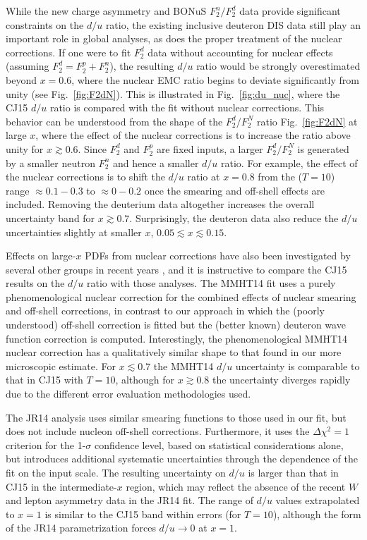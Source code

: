 \documentclass[aps,prd,amsmath,preprint]{revtex4}
\begin{document}
While the new charge asymmetry and BONuS $F_2^n/F_2^d$ data
provide significant constraints on the $d/u$ ratio, the existing
inclusive deuteron DIS data still play an important role in global
analyses, as does the proper treatment of the nuclear corrections.
If one were to fit $F_2^d$ data without accounting for nuclear
effects (assuming $F_2^d = F_2^p + F_2^n$), the resulting $d/u$
ratio would be strongly overestimated beyond $x = 0.6$, where the
nuclear EMC ratio begins to deviate significantly from unity
(see Fig.~\ref{fig:F2dN}).  This is illustrated in
Fig.~\ref{fig:du_nuc}, where the CJ15 $d/u$ ratio is compared
with the fit without nuclear corrections.
This behavior can be understood from the shape of the $F_2^d/F_2^N$
ratio Fig.~\ref{fig:F2dN} at large $x$, where the effect of the
nuclear corrections is to increase the ratio above unity for
$x \gtrsim 0.6$.  Since $F_2^d$ and $F_2^p$ are fixed inputs,
a larger $F_2^d/F_2^N$ is generated by a smaller neutron $F_2^n$
and hence a smaller $d/u$ ratio.  For example, the effect of the
nuclear corrections is to shift the $d/u$ ratio at $x = 0.8$
from the ($T=10$) range $\approx 0.1 - 0.3$ to $\approx 0 - 0.2$
once the smearing and off-shell effects are included.
%
Removing the deuterium data altogether increases the overall
uncertainty band for $x \gtrsim 0.7$.  Surprisingly, the deuteron
data also reduce the $d/u$ uncertainties slightly at smaller $x$,
$0.05 \lesssim x \lesssim 0.15$.


Effects on large-$x$ PDFs from nuclear corrections have also been
investigated by several other groups in recent years \cite{ABKM09, 
ABM11, MMSTWW13, MMHT14, NNPDF13, JR14}, and it is instructive to
compare the CJ15 results on the $d/u$ ratio with those analyses.
The MMHT14 fit \cite{MMHT14} uses a purely phenomenological nuclear
correction for the combined effects of nuclear smearing and
off-shell corrections, in contrast to our approach in which the
(poorly understood) off-shell correction is fitted but the
(better known) deuteron wave function correction is computed.
Interestingly, the phenomenological MMHT14 nuclear correction
has a qualitatively similar shape to that found in our more
microscopic estimate.  For $x \lesssim 0.7$ the MMHT14 $d/u$
uncertainty is comparable to that in CJ15 with $T=10$, although
for $x \gtrsim 0.8$ the uncertainty diverges rapidly due to the
different error evaluation methodologies used.


The JR14 analysis \cite{JR14} uses similar smearing functions to
those used in our fit, but does not include nucleon off-shell
corrections.  Furthermore, it uses the $\Delta\chi^2 = 1$ criterion
for the 1-$\sigma$ confidence level, based on statistical
considerations alone, but introduces additional systematic
uncertainties through the dependence of the fit on the input scale.
The resulting uncertainty on $d/u$ is larger than that in CJ15 in
the intermediate-$x$ region, which may reflect the absence of
the recent $W$ and lepton asymmetry data in the JR14 fit.
The range of $d/u$ values extrapolated to $x = 1$ is similar
to the CJ15 band within errors (for $T=10$), although the form
of the JR14 parametrization forces $d/u \to 0$ at $x=1$.
\end{document}
